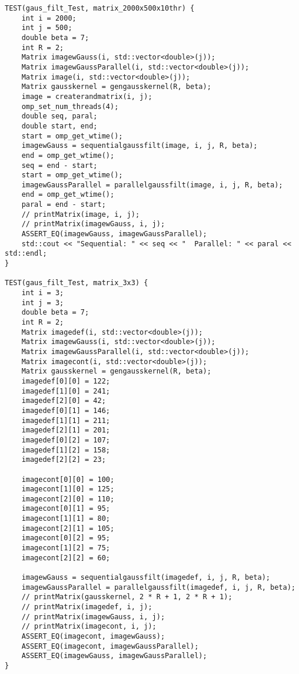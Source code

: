 \documentclass{report}
\begin{document}
\begin{lstlisting}
TEST(gaus_filt_Test, matrix_2000x500x10thr) {
    int i = 2000;
    int j = 500;
    double beta = 7;
    int R = 2;
    Matrix imagewGauss(i, std::vector<double>(j));
    Matrix imagewGaussParallel(i, std::vector<double>(j));
    Matrix image(i, std::vector<double>(j));
    Matrix gausskernel = gengausskernel(R, beta);
    image = createrandmatrix(i, j);
    omp_set_num_threads(4);
    double seq, paral;
    double start, end;
    start = omp_get_wtime();
    imagewGauss = sequentialgaussfilt(image, i, j, R, beta);
    end = omp_get_wtime();
    seq = end - start;
    start = omp_get_wtime();
    imagewGaussParallel = parallelgaussfilt(image, i, j, R, beta);
    end = omp_get_wtime();
    paral = end - start;
    // printMatrix(image, i, j);
    // printMatrix(imagewGauss, i, j);
    ASSERT_EQ(imagewGauss, imagewGaussParallel);
    std::cout << "Sequential: " << seq << "  Parallel: " << paral << std::endl;
}

TEST(gaus_filt_Test, matrix_3x3) {
    int i = 3;
    int j = 3;
    double beta = 7;
    int R = 2;
    Matrix imagedef(i, std::vector<double>(j));
    Matrix imagewGauss(i, std::vector<double>(j));
    Matrix imagewGaussParallel(i, std::vector<double>(j));
    Matrix imagecont(i, std::vector<double>(j));
    Matrix gausskernel = gengausskernel(R, beta);
    imagedef[0][0] = 122;
    imagedef[1][0] = 241;
    imagedef[2][0] = 42;
    imagedef[0][1] = 146;
    imagedef[1][1] = 211;
    imagedef[2][1] = 201;
    imagedef[0][2] = 107;
    imagedef[1][2] = 158;
    imagedef[2][2] = 23;

    imagecont[0][0] = 100;
    imagecont[1][0] = 125;
    imagecont[2][0] = 110;
    imagecont[0][1] = 95;
    imagecont[1][1] = 80;
    imagecont[2][1] = 105;
    imagecont[0][2] = 95;
    imagecont[1][2] = 75;
    imagecont[2][2] = 60;

    imagewGauss = sequentialgaussfilt(imagedef, i, j, R, beta);
    imagewGaussParallel = parallelgaussfilt(imagedef, i, j, R, beta);
    // printMatrix(gausskernel, 2 * R + 1, 2 * R + 1);
    // printMatrix(imagedef, i, j);
    // printMatrix(imagewGauss, i, j);
    // printMatrix(imagecont, i, j);
    ASSERT_EQ(imagecont, imagewGauss);
    ASSERT_EQ(imagecont, imagewGaussParallel);
    ASSERT_EQ(imagewGauss, imagewGaussParallel);
}

\end{lstlisting}
\end{document}

